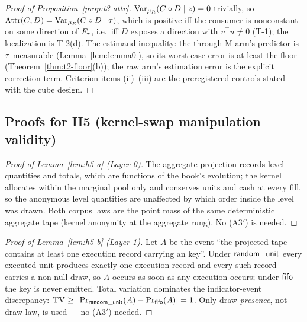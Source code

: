 \begin{proof}[Proof of Proposition~\ref{prop:t3-attr}]
$\mathrm{Var}_{\mu_{R}}(C \circ D \mid z) = 0$ trivially, so
$\mathrm{Attr}(C, D) = \mathrm{Var}_{\mu_{R}}(C \circ D \mid \tau)$, which
is positive iff the consumer is nonconstant on some direction of $F_{\tau}$,
i.e.\ iff $D$ exposes a direction with $v^{\top}u \ne 0$ (T-1); the
localization is T-2(d). The estimand inequality: the through-M arm's
predictor is $\tau$-measurable (Lemma~\ref{lem:lemma0}), so its worst-case
error is at least the floor (Theorem~\ref{thm:t2-floor}(b)); the raw arm's
estimation error is the explicit correction term. Criterion items (ii)--(iii)
are the preregistered controls stated with the cube design.
\end{proof}

\subsection{Proofs for H5 (kernel-swap manipulation validity)}
\label{app:proofs-h5}

\begin{proof}[Proof of Lemma~\ref{lem:h5-a} (Layer 0)]
The aggregate projection records level quantities and totals, which are
functions of the book's evolution; the kernel allocates within the marginal
pool only and conserves units and cash at every fill, so the anonymous level
quantities are unaffected by which order inside the level was drawn. Both
corpus laws are the point mass of the same deterministic aggregate tape
(kernel anonymity at the aggregate rung). No (A3$'$) is needed.
\end{proof}

\begin{proof}[Proof of Lemma~\ref{lem:h5-b} (Layer 1)]
Let $A$ be the event ``the projected tape contains at least one execution
record carrying an  key''. Under $\mathsf{random\_unit}$ every executed
unit produces exactly one execution record and every such record carries a
non-null draw, so $A$ occurs as soon as any execution occurs; under
$\mathsf{fifo}$ the key is never emitted. Total variation dominates the
indicator-event discrepancy:
$\operatorname{TV} \ge |\Pr_{\mathsf{random\_unit}}(A) - \Pr_{\mathsf{fifo}}(A)| = 1$. Only draw
\emph{presence}, not draw law, is used --- no (A3$'$) needed.
\end{proof}

